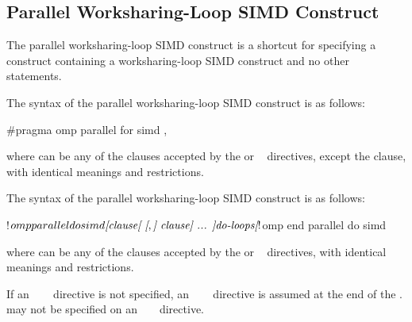 


\subsection{Parallel Worksharing-Loop SIMD Construct}
\label{subsec:Parallel Worksharing-Loop SIMD Construct}
\summary
The parallel worksharing-loop SIMD construct is a shortcut for specifying a 
 construct containing a worksharing-loop SIMD construct and 
no other statements.

\begin{samepage}
\syntax
\begin{ccppspecific}
The syntax of the parallel worksharing-loop SIMD construct is as follows:

\begin{ompcPragma}
#pragma omp parallel for simd \plc{[clause[ [},\plc{] clause] ... ] new-line}
\end{ompcPragma}

where  can be any of the clauses accepted by the 
or ~ directives, except the  clause, with
identical meanings and restrictions.
\end{ccppspecific}
\end{samepage}

\begin{fortranspecific}
\begin{samepage}
The syntax of the parallel worksharing-loop SIMD construct is as follows:

\begin{ompfPragma}
!$omp parallel do simd \plc{[clause[ [},\plc{] clause] ... ]}
    \plc{do-loops}
\plc{[}!$omp end parallel do simd\plc{]}
\end{ompfPragma}
\end{samepage}

where  can be any of the clauses accepted by the 
or ~ directives, with identical meanings and restrictions.

\begin{samepage}
If an ~~~ directive is not specified, an
~~~ directive is assumed at the end of the
.  may not be specified on
an ~ ~ directive.
\end{samepage}
\end{fortranspecific}

